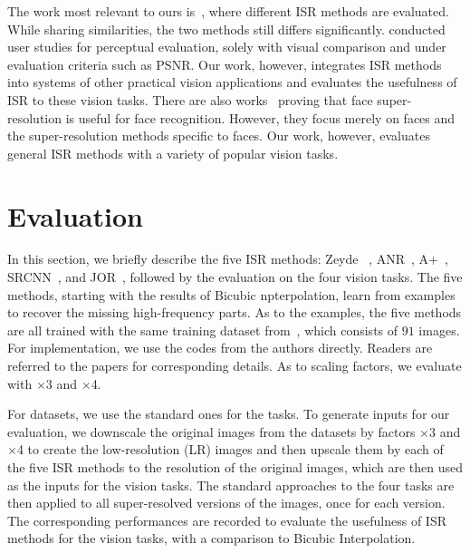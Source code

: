 \documentclass[10pt,twocolumn,letterpaper]{article}
\begin{document}
The work most relevant to ours is~\cite{SR:benchmark}, where different
ISR methods are evaluated. While sharing similarities, the two methods
still differs significantly. \cite{SR:benchmark} conducted user
studies for perceptual evaluation, solely with visual comparison and
under evaluation criteria such as PSNR. Our work, however, integrates
ISR methods into systems of other practical vision applications and
evaluates the usefulness of ISR to these vision tasks. There are also works~\cite{face:SRTIP, face:SR08} proving that face super-resolution is useful for face recognition. However, they focus merely on faces and the super-resolution methods specific to faces. Our work, however, evaluates general ISR methods with a variety of popular vision tasks. 



\section{Evaluation}
\label{se:evalucation}

In this section, we briefly describe the five ISR methods:  Zeyde \etal~\cite{Zeyde-CS-2012},
ANR~\cite{Timofte-ICCV-2013}, A+~\cite{Timofte-ACCV-2014},
SRCNN~\cite{Dong-ECCV-2014}, and JOR~\cite{JOR:EG15}, followed by the
evaluation on the four vision tasks. 
 The five methods, starting with the results of Bicubic npterpolation,  learn from examples to recover the missing high-frequency parts. As to the examples, the five methods are all trained with the same training dataset
from~\cite{Yang-TIP-2010}, which consists of $91$ images. For
implementation, we use the codes from the authors directly. Readers
are referred to the papers for corresponding details. As to scaling
factors, we evaluate with $\times$3 and $\times$4.


For datasets, we use the standard ones for the tasks. To generate inputs
for our evaluation, we downscale the original images from the datasets
by factors $\times$3 and $\times$4 to create the low-resolution (LR)
images and then upscale them by each of the five ISR methods to the resolution of the original images, which are then used as the inputs for the vision tasks. 
The standard approaches to the four tasks are
then applied to all super-resolved versions of the images, once for each version. The corresponding performances are recorded to evaluate the usefulness of ISR methods for the vision tasks, with a comparison to Bicubic Interpolation.
\end{document}
